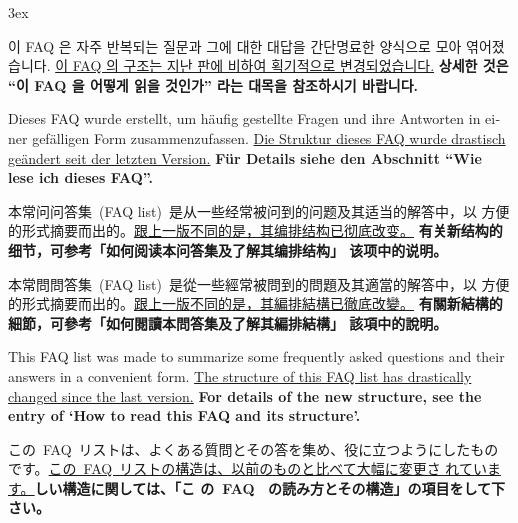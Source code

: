 \documentclass[12pt]{article}
\newenvironment{SChinese}{%
  \CJKfamily{gbsn}%
  \CJKtilde
  \CJKnospace}{}
\newenvironment{TChinese}{%
  \CJKfamily{bsmi}%
  \CJKtilde
  \CJKnospace}{}
\newenvironment{Japanese}{%
  \CJKfamily{min}%
  \CJKtilde
  \CJKnospace}{}
\newenvironment{Korean}{%
  \CJKfamily{mj}}{}
\begin{document}
\parskip 3ex
\parindent 0pt

\begin{CJK}{UTF8}{}

\begin{Korean}
  이 FAQ 은 자주 반복되는 질문과 그에 대한 대답을 간단명료한 양식으로
  모아 엮어졌습니다. \uline{이 FAQ 의 구조는 지난 판에 비하여
    획기적으로 변경되었습니다.}  \textbf{상세한 것은 ``이 FAQ 을 어떻게
    읽을 것인가'' 라는 대목을 참조하시기 바랍니다.}
\end{Korean}

\begin{otherlanguage}{german}
  Dieses FAQ wurde erstellt, um häufig gestellte Fragen und ihre
  Antworten in einer gefälligen Form zusammenzufassen.  \uline{Die
    Struktur dieses FAQ wurde drastisch geändert seit der letzten
    Version.}  \textbf{Für Details siehe den Abschnitt "`Wie lese ich
    dieses FAQ"'.}
\end{otherlanguage}

\begin{SChinese}
  本常问问答集~(FAQ list)~是从一些经常被问到的问题及其适当的解答中，以
  方便的形式摘要而出的。\uline{跟上一版不同的是，其编排结构已彻底改变。}
  \textbf{有关新结构的细节，可参考「如何阅读本问答集及了解其编排结构」
    该项中的说明。}
\end{SChinese}

\begin{TChinese}
  本常問問答集~(FAQ list)~是從一些經常被問到的問題及其適當的解答中，以
  方便的形式摘要而出的。\uline{跟上一版不同的是，其編排結構已徹底改變。}
  \textbf{有關新結構的細節，可參考「如何閱讀本問答集及了解其編排結構」
    該項中的說明。}
\end{TChinese}

This FAQ list was made to summarize some frequently asked questions
and their answers in a convenient form.  \uline{The structure of this
  FAQ list has drastically changed since the last version.}
\textbf{For details of the new structure, see the entry of `How to
  read this FAQ and its structure'.}

\begin{Japanese}
  この~FAQ~リストは、よくある質問とその答を集め、役に立つようにしたもの
  です。\uline{この~FAQ~リストの構造は、以前のものと比べて大幅に変更さ
    れています。}\textbf{しい構造に関しては、「こ
    の~FAQ~ の読み方とその構造」の項目をして下さい。}
\end{Japanese}


\end{CJK}
\end{document}
